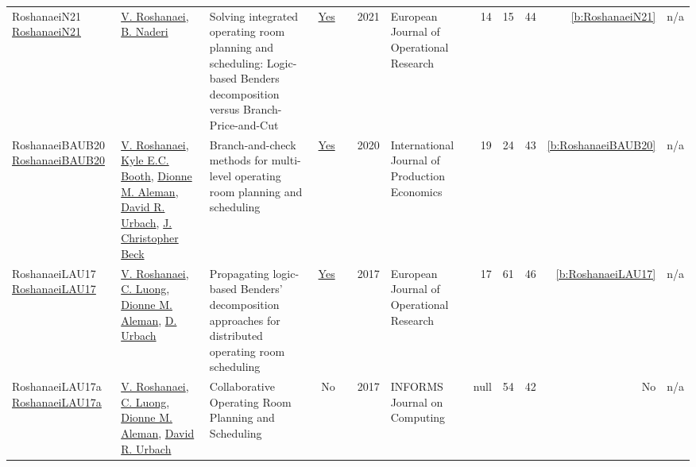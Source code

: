 {\begin{longtable}{>{\raggedright\arraybackslash}p{3cm}>{\raggedright\arraybackslash}p{6cm}>{\raggedright\arraybackslash}p{6.5cm}rrrp{2.5cm}rrrrr}
RoshanaeiN21 \href{http://dx.doi.org/10.1016/j.ejor.2020.12.004}{RoshanaeiN21} & \hyperref[auth:a734]{V. Roshanaei}, \hyperref[auth:a732]{B. Naderi} & Solving integrated operating room planning and scheduling: Logic-based Benders decomposition versus Branch-Price-and-Cut & \href{../works/RoshanaeiN21.pdf}{Yes} & \cite{RoshanaeiN21} & 2021 & European Journal of Operational Research & 14 & 15 & 44 & \ref{b:RoshanaeiN21} & n/a\\
RoshanaeiBAUB20 \href{http://dx.doi.org/10.1016/j.ijpe.2019.07.006}{RoshanaeiBAUB20} & \hyperref[auth:a734]{V. Roshanaei}, \hyperref[auth:a992]{Kyle E.C. Booth}, \hyperref[auth:a902]{Dionne M. Aleman}, \hyperref[auth:a903]{David R. Urbach}, \hyperref[auth:a89]{J. Christopher Beck} & Branch-and-check methods for multi-level operating room planning and scheduling & \href{../works/RoshanaeiBAUB20.pdf}{Yes} & \cite{RoshanaeiBAUB20} & 2020 & International Journal of Production Economics & 19 & 24 & 43 & \ref{b:RoshanaeiBAUB20} & n/a\\
RoshanaeiLAU17 \href{http://dx.doi.org/10.1016/j.ejor.2016.08.024}{RoshanaeiLAU17} & \hyperref[auth:a734]{V. Roshanaei}, \hyperref[auth:a935]{C. Luong}, \hyperref[auth:a902]{Dionne M. Aleman}, \hyperref[auth:a936]{D. Urbach} & Propagating logic-based Benders' decomposition approaches for distributed operating room scheduling & \href{../works/RoshanaeiLAU17.pdf}{Yes} & \cite{RoshanaeiLAU17} & 2017 & European Journal of Operational Research & 17 & 61 & 46 & \ref{b:RoshanaeiLAU17} & n/a\\
RoshanaeiLAU17a \href{http://dx.doi.org/10.1287/ijoc.2017.0745}{RoshanaeiLAU17a} & \hyperref[auth:a734]{V. Roshanaei}, \hyperref[auth:a935]{C. Luong}, \hyperref[auth:a902]{Dionne M. Aleman}, \hyperref[auth:a903]{David R. Urbach} & Collaborative Operating Room Planning and Scheduling & No & \cite{RoshanaeiLAU17a} & 2017 & INFORMS Journal on Computing & null & 54 & 42 & No & n/a\\
\end{longtable}
}

\clearpage
